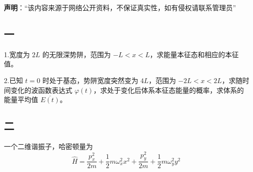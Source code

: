 
\textbf{声明}：“该内容来源于网络公开资料，不保证真实性，如有侵权请联系管理员”

\subsection{一}
1.宽度为 $2L$ 的无限深势阱，范围为 $-L < x < L$，求能量本征态和相应的本征值。

2.已知 $t = 0$ 时处于基态，势阱宽度突然变为 $4L$，范围为 $-2L < x < 2L$，求随时间变化的波函数表达式 $\varphi(t)$，求处于变化后体系本征态能量的概率，求体系的能量平均值 $\overline{E(t)}$。
\subsection{二}
一个二维谐振子，哈密顿量为
$$\hat{H} = \frac{p_x^2}{2m} + \frac{1}{2} m \omega_x^2 x^2 + \frac{p_y^2}{2m} + \frac{1}{2} m \omega_y^2 y^2~$$
